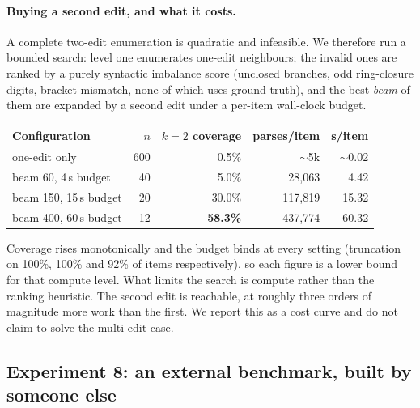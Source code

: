 \documentclass[journal=jcisd8,manuscript=article]{achemso}
\begin{document}
\paragraph{Buying a second edit, and what it costs.}
A complete two-edit enumeration is quadratic and infeasible. We therefore run a
bounded search: level one enumerates one-edit neighbours; the invalid ones are
ranked by a purely syntactic imbalance score (unclosed branches, odd
ring-closure digits, bracket mismatch, none of which uses ground truth), and the best
\emph{beam} of them are expanded by a second edit under a per-item wall-clock
budget.

\begin{center}\small
\begin{tabular}{lrrrr}
\toprule
Configuration & $n$ & $k{=}2$ coverage & parses/item & s/item \\
\midrule
one-edit only            & 600 & 0.5\%           & $\sim$5k    & $\sim$0.02 \\
beam 60, 4\,s budget     & 40  & 5.0\%           & 28{,}063    & 4.42 \\
beam 150, 15\,s budget   & 20  & 30.0\%          & 117{,}819   & 15.32 \\
beam 400, 60\,s budget   & 12  & \textbf{58.3\%} & 437{,}774   & 60.32 \\
\bottomrule
\end{tabular}
\end{center}

\noindent
Coverage rises monotonically and the budget binds at every setting (truncation
on 100\%, 100\% and 92\% of items respectively), so each figure is a lower bound
for that compute level. What limits the search is compute rather than the ranking
heuristic. The second edit is reachable, at roughly three orders of magnitude
more work than the first. We report this as a cost curve and do not claim to
solve the multi-edit case.

\subsection{Experiment 8: an external benchmark, built by someone else}\label{sec:exp8}
\end{document}
